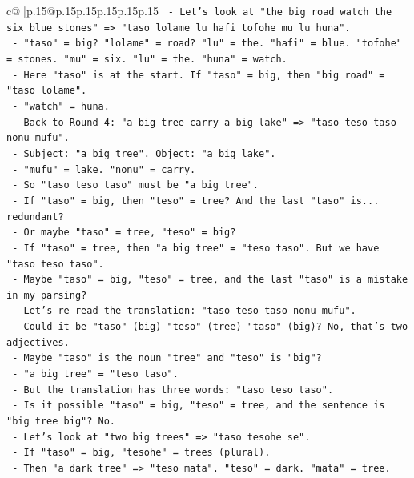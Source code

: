 \documentclass{article}
\begin{document}
{\begin{supertabular}{c@{$\;$}|p{.15\linewidth}@{}p{.15\linewidth}p{.15\linewidth}p{.15\linewidth}p{.15\linewidth}p{.15\linewidth}}
{{{\texttt{    {-} Let's look at "the big road watch the six blue stones" => "taso lolame lu hafi tofohe mu lu huna".} \\
\texttt{      {-} "taso" = big? "lolame" = road? "lu" = the. "hafi" = blue. "tofohe" = stones. "mu" = six. "lu" = the. "huna" = watch.} \\
\texttt{      {-} Here "taso" is at the start. If "taso" = big, then "big road" = "taso lolame".} \\
\texttt{      {-} "watch" = huna.} \\
\texttt{    {-} Back to Round 4: "a big tree carry a big lake" => "taso teso taso nonu mufu".} \\
\texttt{      {-} Subject: "a big tree". Object: "a big lake".} \\
\texttt{      {-} "mufu" = lake. "nonu" = carry.} \\
\texttt{      {-} So "taso teso taso" must be "a big tree".} \\
\texttt{      {-} If "taso" = big, then "teso" = tree? And the last "taso" is... redundant?} \\
\texttt{      {-} Or maybe "taso" = tree, "teso" = big?} \\
\texttt{      {-} If "taso" = tree, then "a big tree" = "teso taso". But we have "taso teso taso".} \\
\texttt{      {-} Maybe "taso" = big, "teso" = tree, and the last "taso" is a mistake in my parsing?} \\
\texttt{      {-} Let's re{-}read the translation: "taso teso taso nonu mufu".} \\
\texttt{      {-} Could it be "taso" (big) "teso" (tree) "taso" (big)? No, that's two adjectives.} \\
\texttt{      {-} Maybe "taso" is the noun "tree" and "teso" is "big"?} \\
\texttt{        {-} "a big tree" = "teso taso".} \\
\texttt{        {-} But the translation has three words: "taso teso taso".} \\
\texttt{        {-} Is it possible "taso" = big, "teso" = tree, and the sentence is "big tree big"? No.} \\
\texttt{        {-} Let's look at "two big trees" => "taso tesohe se".} \\
\texttt{          {-} If "taso" = big, "tesohe" = trees (plural).} \\
\texttt{          {-} Then "a dark tree" => "teso mata". "teso" = dark. "mata" = tree.} \\
}}}
\end{supertabular}}
\end{document}
